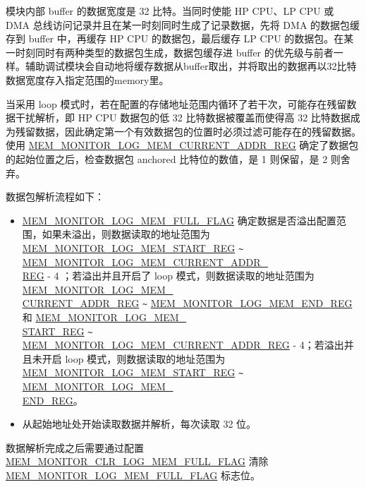 \documentclass[main\_\_CN.tex]{subfiles}
\begin{document}
模块内部 buffer 的数据宽度是 32 比特。当同时使能 HP CPU、LP CPU 或 DMA 总线访问记录并且在某一时刻同时生成了记录数据，先将 DMA 的数据包缓存到 buffer 中，再缓存 HP CPU 的数据包，最后缓存 LP CPU 的数据包。在某一时刻同时有两种类型的数据包生成，数据包缓存进 buffer 的优先级与前者一样。辅助调试模块会自动地将缓存数据从buffer取出，并将取出的数据再以32比特数据宽度存入指定范围的memory里。

当采用 loop 模式时，若在配置的存储地址范围内循环了若干次，可能存在残留数据干扰解析，即 HP CPU 数据包的低 32 比特数据被覆盖而使得高 32 比特数据成为残留数据，因此确定第一个有效数据包的位置时必须过滤可能存在的残留数据。使用 \hyperref[regdesc:MEMMONITORLOGMEMCURRENTADDRREG]{MEM\_MONITOR\_LOG\_MEM\_CURRENT\_ADDR\_REG} 确定了数据包的起始位置之后，检查数据包 anchored 比特位的数值，是 1 则保留，是 2 则舍弃。

数据包解析流程如下：

\begin{itemize}
    \item 
    \hyperref[fielddesc:MEMMONITORLOGMEMFULLFLAG]{MEM\_MONITOR\_LOG\_MEM\_FULL\_FLAG} 确定数据是否溢出配置范围，如果未溢出，则数据读取的地址范围为 \hyperref[regdesc:MEMMONITORLOGMEMSTARTREG]{MEM\_MONITOR\_LOG\_MEM\_START\_REG}  \verb+~+ \hyperref[regdesc:MEMMONITORLOGMEMCURRENTADDRREG]{MEM\_MONITOR\_LOG\_MEM\_CURRENT\_ADDR\_\\REG} - 4 ；若溢出并且开启了 loop 模式，则数据读取的地址范围为 
    \hyperref[regdesc:MEMMONITORLOGMEMCURRENTADDRREG]{MEM\_MONITOR\_LOG\_MEM\_\\CURRENT\_ADDR\_REG} \verb+~+ \hyperref[regdesc:MEMMONITORLOGMEMENDREG]{MEM\_MONITOR\_LOG\_MEM\_END\_REG} 和
\hyperref[regdesc:MEMMONITORLOGMEMSTARTREG]{MEM\_MONITOR\_LOG\_MEM\_\\START\_REG}  \verb+~+ \hyperref[regdesc:MEMMONITORLOGMEMCURRENTADDRREG]{MEM\_MONITOR\_LOG\_MEM\_CURRENT\_ADDR\_REG} - 4；若溢出并且未开启 loop 模式，则数据读取的地址范围为 \hyperref[regdesc:MEMMONITORLOGMEMSTARTREG]{MEM\_MONITOR\_LOG\_MEM\_START\_REG} \verb+~+ \hyperref[regdesc:MEMMONITORLOGMEMENDREG]{MEM\_MONITOR\_LOG\_MEM\_\\END\_REG}。
    
    \item 从起始地址处开始读取数据并解析，每次读取 32 位。
    
\end{itemize}

数据解析完成之后需要通过配置 \hyperref[fielddesc:MEMMONITORCLRLOGMEMFULLFLAG]{MEM\_MONITOR\_CLR\_LOG\_MEM\_FULL\_FLAG} 清除 \\ \hyperref[fielddesc:MEMMONITORLOGMEMFULLFLAG]{MEM\_MONITOR\_LOG\_MEM\_FULL\_FLAG} 标志位。
\end{document}
